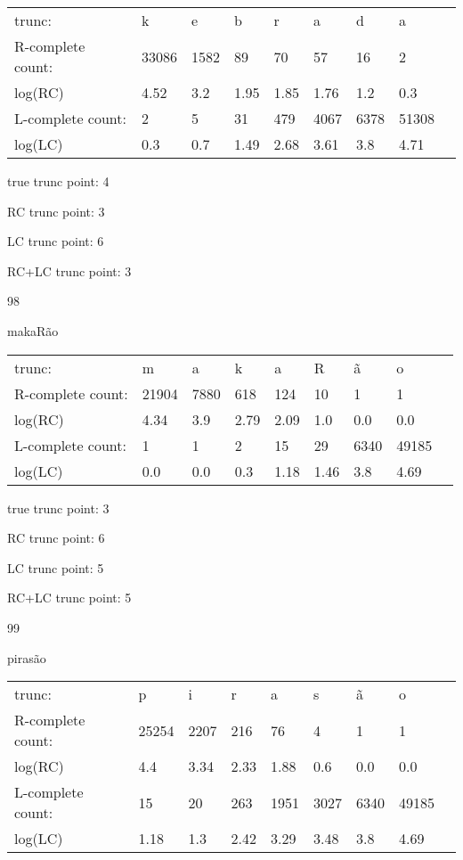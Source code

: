 \documentclass{article}
\begin{document}
\begin{tabular}{l|llllllll}
trunc: & k & e & b & r & a & d & a & \\ 
R-complete count: & 33086 & 1582 & 89 & 70 & 57 & 16 & 2 & \\ 
log(RC) & 4.52 & 3.2 & 1.95 & 1.85 & 1.76 & 1.2 & 0.3 & \\ 
L-complete count: & 2 & 5 & 31 & 479 & 4067 & 6378 & 51308 & \\ 
log(LC) & 0.3 & 0.7 & 1.49 & 2.68 & 3.61 & 3.8 & 4.71 & \\ 
\end{tabular}

true trunc point: 4

RC trunc point: 3

LC trunc point: 6

RC+LC trunc point: 3

\vspace{1em}

98

makaRão

\begin{tabular}{l|llllllll}
trunc: & m & a & k & a & R & ã & o & \\ 
R-complete count: & 21904 & 7880 & 618 & 124 & 10 & 1 & 1 & \\ 
log(RC) & 4.34 & 3.9 & 2.79 & 2.09 & 1.0 & 0.0 & 0.0 & \\ 
L-complete count: & 1 & 1 & 2 & 15 & 29 & 6340 & 49185 & \\ 
log(LC) & 0.0 & 0.0 & 0.3 & 1.18 & 1.46 & 3.8 & 4.69 & \\ 
\end{tabular}

true trunc point: 3

RC trunc point: 6

LC trunc point: 5

RC+LC trunc point: 5

\vspace{1em}

99

pirasão

\begin{tabular}{l|llllllll}
trunc: & p & i & r & a & s & ã & o & \\ 
R-complete count: & 25254 & 2207 & 216 & 76 & 4 & 1 & 1 & \\ 
log(RC) & 4.4 & 3.34 & 2.33 & 1.88 & 0.6 & 0.0 & 0.0 & \\ 
L-complete count: & 15 & 20 & 263 & 1951 & 3027 & 6340 & 49185 & \\ 
log(LC) & 1.18 & 1.3 & 2.42 & 3.29 & 3.48 & 3.8 & 4.69 & \\ 
\end{tabular}
\end{document}
